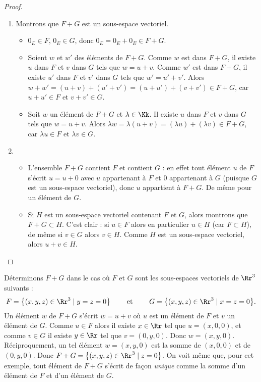 \documentclass[class=report,crop=false]{standalone}
\begin{document}
\begin{proof}
~
\begin{enumerate}
  \item Montrons que $F+G$ est un sous-espace vectoriel.
  \begin{itemize}
    \item $0_E \in F$, $0_E \in G$, donc $0_E = 0_E + 0_E \in F+G$.

    \item Soient $w$ et $w'$ des éléments de $F+G$.
  Comme $w$ est dans $F+G$, il existe $u$ dans $F$ et $v$ dans $G$ tels que $w=u+v$.
  Comme $w'$ est dans $F+G$, il existe $u'$ dans $F$ et $v'$ dans $G$ tels que $w'=u'+v'$.
  Alors $w+w' = (u+v)+(u'+v') = (u+u')+(v+v') \in F+G$, car $u+u' \in F$ et $v+v' \in G$.

    \item Soit $w$ un élément de $F+G$ et $\lambda \in \Kk$.
    Il existe $u$ dans $F$ et $v$ dans $G$ tels que $w=u+v$.
    Alors $\lambda w = \lambda(u+v) = (\lambda u)+(\lambda v) \in F+G$, car $\lambda u \in F$ et $\lambda v \in G$.
  \end{itemize}


  \item
  \begin{itemize}
    \item L'ensemble  $F+G$ contient $F$ et contient $G$ : en effet tout élément $u$
de $F$ s'écrit $u=u+0$ avec $u$ appartenant à $F$ et $0$ appartenant à $G$
(puisque $G$ est un sous-espace vectoriel), donc $u$ appartient à $F+G$.
De même pour un élément de $G$.

    \item Si $H$ est un sous-espace vectoriel contenant $F$ et $G$, alors
    montrons que $F+G \subset H$.
    C'est clair : si $u \in F$ alors en particulier $u\in H$ (car $F\subset H$),
    de même si $v \in G$ alors $v \in H$. Comme $H$ est un sous-espace vectoriel, alors
    $u+v \in H$.
  \end{itemize}
\end{enumerate}
\end{proof}



\begin{exemple}

Déterminons $F+G$  dans le cas où $F$ et $G$ sont les sous-espaces vectoriels de
$\Rr^3$ suivants :
$$F=\big\{(x,y,z) \in \Rr^3\mid y=z=0\big\}
\qquad\text{ et }\qquad
G=\big\{(x,y,z) \in \Rr^3 \mid x=z=0\big\}.$$
Un élément $w$ de $F+G$ s'écrit $w=u+v$ où $u$ est un élément de
$F$ et $v$ un élément de $G$. Comme $u\in F$ alors il existe $x \in \Rr$ tel que $u=(x,0,0)$,
et comme $v \in G$ il existe $y \in \Rr$ tel que $v=(0,y,0)$. Donc $w=(x,y,0)$.
Réciproquement, un tel élément $w=(x,y,0)$ est la somme de $(x,0,0)$
et de $(0,y,0)$. Donc $F+G=\big\{(x,y,z) \in \Rr^3\mid z=0\big\}$.
On voit même que, pour cet exemple, tout élément de $F+G$ s'écrit
de façon \emph{unique} comme la somme d'un élément de $F$ et d'un élément de $G$.
\end{exemple}
\end{document}
